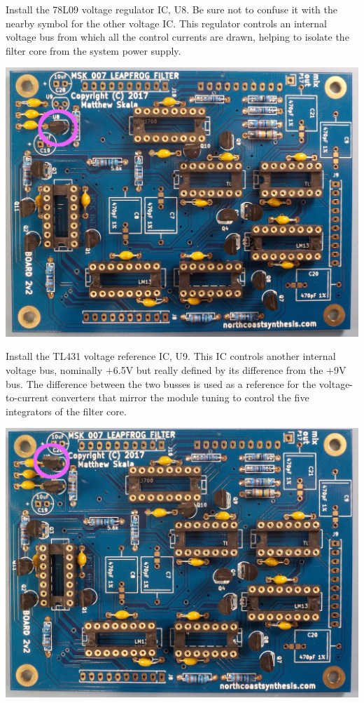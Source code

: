 Install the 78L09 voltage regulator IC, U8.  Be sure not to confuse it with
the nearby symbol for the other voltage IC.  This regulator controls an
internal voltage bus from which all the control currents are drawn,
helping to isolate the filter core from the system power supply.

\nopagebreak
\noindent\includegraphics[width=\linewidth]{78l09.jpg}

\pagebreak

Install the TL431 voltage reference IC, U9.  This IC controls another
internal voltage bus, nominally $+$6.5V but really defined by its difference
from the $+$9V bus.  The difference between the two busses is used as a
reference for the voltage-to-current converters that mirror the module
tuning to control the five integrators of the filter core.

\nopagebreak
\noindent\includegraphics[width=\linewidth]{tl431.jpg}

